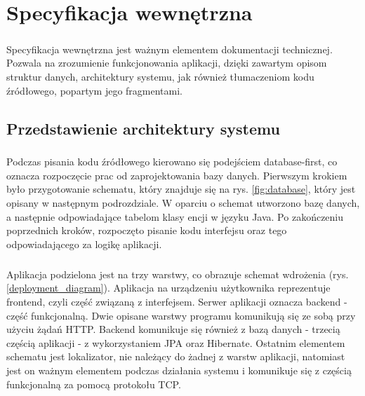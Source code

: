 \chapter{Specyfikacja wewnętrzna}
\label{ch:05}

\paragraph{}
Specyfikacja wewnętrzna jest ważnym elementem dokumentacji technicznej. Pozwala na zrozumienie funkcjonowania aplikacji, dzięki zawartym opisom struktur danych, architektury systemu, jak również tłumaczeniom kodu źródłowego, popartym jego fragmentami.

\section{Przedstawienie architektury systemu}
\paragraph{}
Podczas pisania kodu źródłowego kierowano się podejściem database-first, co oznacza rozpoczęcie prac od zaprojektowania bazy danych. Pierwszym krokiem było przygotowanie schematu, który znajduje się na rys. \ref{fig:database}, który jest opisany w następnym podrozdziale. W oparciu o schemat utworzono bazę danych, a następnie odpowiadające tabelom klasy encji w języku Java. Po zakończeniu poprzednich kroków, rozpoczęto pisanie kodu interfejsu oraz tego odpowiadającego za logikę aplikacji. 

\paragraph{}
Aplikacja podzielona jest na trzy warstwy, co obrazuje schemat wdrożenia (rys. \ref{deployment_diagram}). Aplikacja na urządzeniu użytkownika reprezentuje frontend, czyli część związaną z interfejsem. Serwer aplikacji oznacza backend - część funkcjonalną. Dwie opisane warstwy programu komunikują się ze sobą przy użyciu żądań HTTP. Backend komunikuje się również z bazą danych - trzecią częścią aplikacji - z wykorzystaniem JPA oraz Hibernate. Ostatnim elementem schematu jest lokalizator, nie należący do żadnej z warstw aplikacji, natomiast jest on ważnym elementem podczas działania systemu i komunikuje się z częścią funkcjonalną za pomocą protokołu TCP.

